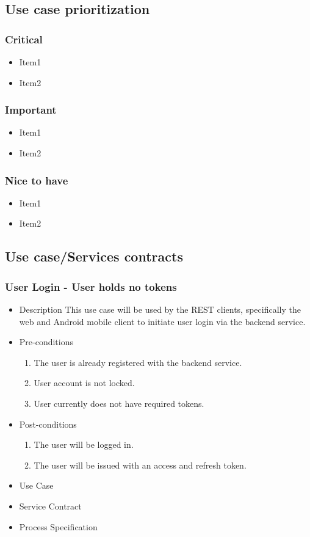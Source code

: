 \documentclass[a4paper,10pt]{article}
\begin{document}
\subsection{Use case prioritization}
\subsubsection{Critical}
\begin{itemize}
\item Item1
\item Item2
\end{itemize}

\subsubsection{Important}
\begin{itemize}
\item Item1
\item Item2
\end{itemize}

\subsubsection{Nice to have}
\begin{itemize}
\item Item1
\item Item2
\end{itemize}

\subsection{Use case/Services contracts}
\subsubsection{User Login - User holds no tokens}
	\begin{itemize}
		\item Description
		This use case will be used by the REST clients, specifically the web and Android mobile client to initiate user login via the backend service. 
		\item Pre-conditions
			\begin{enumerate}
				\item The user is already registered with the backend service.
				\item User account is not locked.
				\item User currently does not have required tokens.
			\end{enumerate}
		\item Post-conditions
			\begin{enumerate}
				\item The user will be logged in.
				\item The user will be issued with an access and refresh token.			
			\end{enumerate}
		\item Use Case
		\item Service Contract
		\item Process Specification
	\end{itemize}
	
\end{document}
